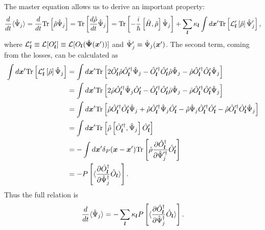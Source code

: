 The master equation allows us to derive an important property:
\begin{equation*}
\begin{split}
	\frac{d}{dt} \langle \hat{\Psi}_j \rangle
	= \frac{d}{dt} \mathrm{Tr} \left[ \hat{\rho} \hat{\Psi}_j \right]
	= \mathrm{Tr} \left[ \frac{d\hat{\rho}}{dt} \hat{\Psi}_j \right]
	= \mathrm{Tr} \left[ -\frac{i}{\hbar} \left[ \hat{H}, \hat{\rho} \right] \hat{\Psi}_j \right]
	+ \sum\limits_{\boldsymbol{l}} \kappa_{\boldsymbol{l}} \int d\boldsymbol{x}^\prime
		\mathrm{Tr} \left[
			\mathcal{L}_{\boldsymbol{l}}^\prime \left[ \hat{\rho} \right]
			\hat{\Psi}_j^\prime
		\right],
\end{split}
\end{equation*}
where $\mathcal{L}_{\boldsymbol{l}}^\prime \equiv \mathcal{L} [ O_{\boldsymbol{l}}^\prime ] \equiv \mathcal{L} [ O_{\boldsymbol{l}} ( \hat{\boldsymbol{\Psi}}(\boldsymbol{x}^\prime) ) ]$ and $\hat{\Psi}_j^\prime \equiv \hat{\Psi}_j (\boldsymbol{x}^\prime)$.
The second term, coming from the losses, can be calculated as
\begin{equation*}
\begin{split}
	\int d\boldsymbol{x}^\prime
		\mathrm{Tr} \left[
			\mathcal{L}_{\boldsymbol{l}}^\prime \left[ \hat{\rho} \right]
			\hat{\Psi}_j
		\right]
	& = \int d\boldsymbol{x}^\prime
		\mathrm{Tr} \left[
			2 \hat{O}_{\boldsymbol{l}}^\prime \hat{\rho} \hat{O}_{\boldsymbol{l}}^{\prime\dagger} \hat{\Psi}_j
			- \hat{O}_{\boldsymbol{l}}^{\prime\dagger} \hat{O}_{\boldsymbol{l}}^\prime \hat{\rho} \hat{\Psi}_j
			- \hat{\rho} \hat{O}_{\boldsymbol{l}}^{\prime\dagger} \hat{O}_{\boldsymbol{l}}^\prime \hat{\Psi}_j
		\right] \\
	& = \int d\boldsymbol{x}^\prime
		\mathrm{Tr} \left[
			2 \hat{\rho} \hat{O}_{\boldsymbol{l}}^{\prime\dagger} \hat{\Psi}_j \hat{O}_{\boldsymbol{l}}^\prime
			- \hat{O}_{\boldsymbol{l}}^{\prime\dagger} \hat{O}_{\boldsymbol{l}}^\prime \hat{\rho} \hat{\Psi}_j
			- \hat{\rho} \hat{O}_{\boldsymbol{l}}^{\prime\dagger} \hat{O}_{\boldsymbol{l}}^\prime \hat{\Psi}_j
		\right] \\
	& = \int d\boldsymbol{x}^\prime
		\mathrm{Tr} \left[
			\hat{\rho} \hat{O}_{\boldsymbol{l}}^{\prime\dagger} \hat{O}_{\boldsymbol{l}}^\prime \hat{\Psi}_j
			+ \hat{\rho} \hat{O}_{\boldsymbol{l}}^{\prime\dagger} \hat{\Psi}_j \hat{O}_{\boldsymbol{l}}^\prime
			- \hat{\rho} \hat{\Psi}_j \hat{O}_{\boldsymbol{l}}^{\prime\dagger} \hat{O}_{\boldsymbol{l}}^\prime
			- \hat{\rho} \hat{O}_{\boldsymbol{l}}^{\prime\dagger} \hat{O}_{\boldsymbol{l}}^\prime \hat{\Psi}_j
		\right] \\
	& = \int d\boldsymbol{x}^\prime
		\mathrm{Tr} \left[
			\hat{\rho} \left[
				\hat{O}_{\boldsymbol{l}}^{\prime\dagger}, \hat{\Psi}_j
			\right] \hat{O}_{\boldsymbol{l}}^\prime
		\right] \\
	& = -\int d\boldsymbol{x}^\prime \delta_P(\boldsymbol{x} - \boldsymbol{x}^\prime)
		\mathrm{Tr} \left[
			\hat{\rho} \frac{\partial \hat{O}_{\boldsymbol{l}}^\dagger}{\partial \hat{\Psi}_j^{\prime\dagger}}
			\hat{O}_{\boldsymbol{l}}^\prime
		\right] \\
	& = - P \left[ \langle
		\frac{\partial \hat{O}_{\boldsymbol{l}}^\dagger}{\partial \hat{\Psi}_j^\dagger} \hat{O}_{\boldsymbol{l}}
	\rangle \right].
\end{split}
\end{equation*}
Thus the full relation is
\[
	\frac{d}{dt} \langle \hat{\Psi}_j \rangle
	= -\sum\limits_{\boldsymbol{l}} \kappa_{\boldsymbol{l}} P \left[ \langle
		\frac{\partial \hat{O}_{\boldsymbol{l}}^\dagger}{\partial \hat{\Psi}_j^\dagger} \hat{O}_{\boldsymbol{l}}
	\rangle \right].
\]

